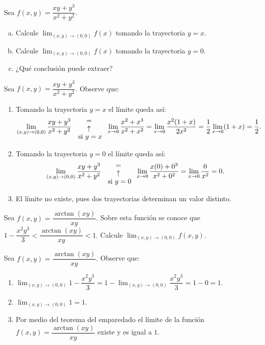 \begin{prob}
Sea $f(x,y)=\dfrac{xy+y^3}{x^2+y^2}.$
\begin{enumerate}[(a)]
    \item Calcule $\displaystyle\lim_{(x,y)\to (0,0)}f(x)$ tomando la trayectoria $y=x.$
    \item Calcule $\displaystyle\lim_{(x,y)\to (0,0)}f(x)$ tomando la trayectoria $y=0.$
    \item ¿Qué conclusión puede extraer?
\end{enumerate}
\begin{myproof}
Sea $f(x,y)=\dfrac{xy+y^3}{x^2+y^2}.$ Observe que:
\begin{enumerate}[$a)$]
\item Tomando la trayectoria $y=x$ el límite queda así:
\begin{align*}
\displaystyle\lim_{(x,y)\to (0,0)} \dfrac{xy+y^3}{x^2+y^2} {{=}\atop {\begin{array}{c}
\uparrow\\ \text{ si $y=x$}\end{array}} } \displaystyle\lim_{x\to 0}\dfrac{x^2+x^3}{x^2+x^2}=\displaystyle\lim_{x\to 0}\dfrac{x^2(1+x)}{2x^2}=\dfrac{1}{2}\lim_{x\to 0}(1+x)=\dfrac{1}{2}.
\end{align*}
\item Tomando la trayectoria $y=0$ el límite queda así:
\begin{align*}
\displaystyle\lim_{(x,y)\to (0,0)} \dfrac{xy+y^3}{x^2+y^2} {{=}\atop {\begin{array}{c}
\uparrow\\ \text{ si $y=0$}\end{array}} } \displaystyle\lim_{x\to 0}\dfrac{x(0)+0^3}{x^2+0^2}=\displaystyle\lim_{x\to 0}\dfrac{0}{x^2}=0.
\end{align*}
\item El límite no existe, pues dos trayectorias determinan un valor distinto.
\end{enumerate}
\end{myproof}
\end{prob}

\begin{prob}
Sea $f(x,y)=\dfrac{\arctan(xy)}{xy}.$ Sobre esta función se conoce que $1-\dfrac{x^2y^3}{3}<\dfrac{\arctan (xy)}{xy}<1.$ Calcule $\displaystyle\lim_{(x,y)\to (0,0)}f(x,y).$
\begin{myproof}
Sea $f(x,y)=\dfrac{\arctan(xy)}{xy}.$ Observe que:
\begin{enumerate}[$a)$]
\item $\displaystyle\lim_{(x,y)\to (0,0)} 1-\dfrac{x^2y^3}{3} = 1-\displaystyle\lim_{(x,y)\to (0,0)} \dfrac{x^2y^3}{3}=1-0=1.$
\item $\displaystyle\lim_{(x,y)\to (0,0)} 1=1.$
\item Por medio del teorema del emparedado el límite de la función $f(x,y)=\dfrac{\arctan(xy)}{xy}$  existe y es igual a $1.$
\end{enumerate}
\end{myproof}
\end{prob}

